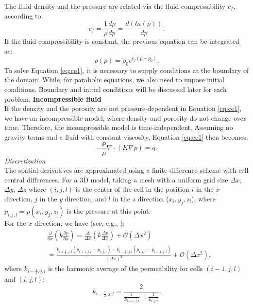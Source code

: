 \documentclass[12pt]{article}
\begin{document}
The fluid density and the pressure are related via the fluid compressibility $c_f$, according to:
\begin{equation*}\label{eq:fc}
 c_f=\frac{1}{\rho}\frac{d\rho}{dp}=\frac{d(ln(\rho))}{dp}.
\end{equation*}
If the fluid compressibility is constant, the previous equation can be integrated as:
\begin{equation}\label{eq:rhoeq}
 \rho(p)=\rho_0 e^{c_f({p}-{p}_0)}.
\end{equation}
To solve Equation \eqref{eq:ce1}, it is necessary to supply conditions at the boundary of the domain. While, for parabolic equations, we also need to impose initial conditions. Boundary and initial conditions will be discussed later for each problem.   \newpage
\textbf{Incompressible fluid}\\
If the density and the porosity are not pressure-dependent in Equation \eqref{eq:ce1}, we have an incompressible model, where density and porosity do not change over time. Therefore, the incompressible model is time-independent. Assuming no gravity terms and a fluid with constant viscosity, Equation \eqref{eq:ce1} then becomes:
\begin{equation}\label{eq:cel}
-\frac{\mathbf{\rho}}{\mu}\nabla \cdot \left({K} \nabla p\right)=q.
\end{equation}
\emph{Discretization}\\
The spatial derivatives are approximated using a finite difference scheme with cell central 
differences. For a 3D model, taking a mesh with a uniform grid size $\Delta x$, $\Delta y$, $\Delta z$ where $(i,j,l)$ is the center 
of the cell
in the position $i$ in the $x$ direction, $j$ in the $y$ direction, and $l$ in the $z$ direction
($x_i,y_j,z_l$), where $p_{i,j,l}=p(x_i,y_j,z_l)$ is 
the pressure at this point.
\\ For the $x$ direction, we have (see, e.g., \cite{Aziz79,Chen06,Jansen13}):
\begin{align*}
&\frac{\partial}{\partial x}\left(k\frac{\partial p}{\partial x}\right) = 
\frac{\Delta}{\Delta x}\left(k\frac{\Delta p}{\Delta x}\right) +\mathscr{O}(\Delta x^2)\\
&=\frac{ k_{i+\frac{1}{2},j,l}(p_{i+1,j,l}-p_{i,j,l})-k_{i-\frac{1}{2},j,l}(p_{i,j,l}-p_{i-1,j,l})}{\left( \Delta x\right)^2}+\mathscr{O}(\Delta x^2),
\end{align*}
where $k_{i-\frac{1}{2},j,l}$ is the harmonic average of the permeability for cells 
$(i-1,j,l)$ and $(i,j,l)$:
\begin{equation}\label{eq:ha}
 k_{i-\frac{1}{2},j,l}=\frac{2}{\frac{1}{ k_{i-1,j,l}}+\frac{1}{ k_{i,j,l}}}.
\end{equation}
\end{document}
